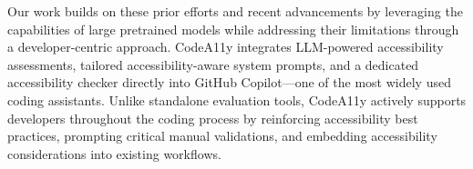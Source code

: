 \begin{highlight}
{Our work builds on these prior efforts and recent advancements by leveraging the capabilities of large pretrained models while addressing their limitations through a developer-centric approach. CodeA11y integrates LLM-powered accessibility assessments, tailored accessibility-aware system prompts, and a dedicated accessibility checker directly into GitHub Copilot---one of the most widely used coding assistants. Unlike standalone evaluation tools, CodeA11y actively supports developers throughout the coding process by reinforcing accessibility best practices, prompting critical manual validations, and embedding accessibility considerations into existing workflows.
%

}
\end{highlight}
